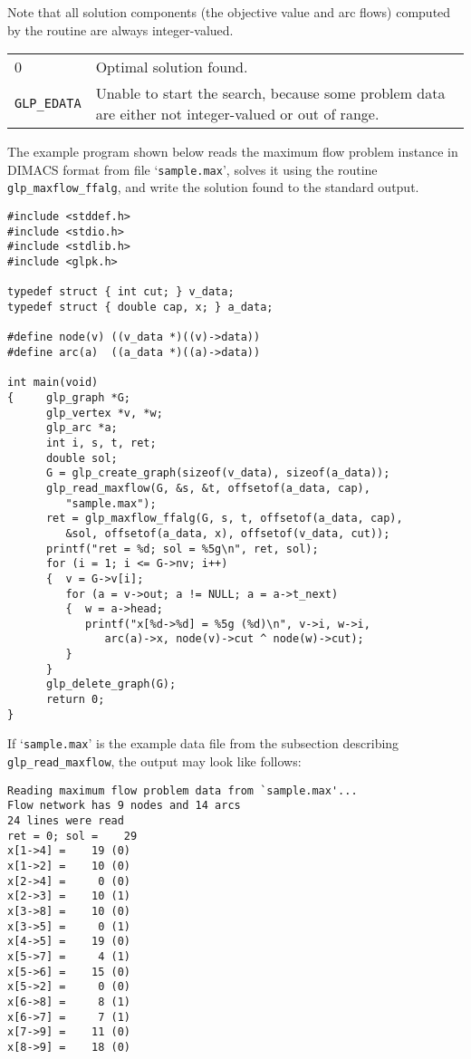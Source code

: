 \documentclass[11pt]{report}
\makeatletter
\def\para#1{\noindent{\bf#1}}
\def\returns{\para{Returns}}
\newenvironment{retlist}
{  \def\arraystretch{1.5}
   \noindent
   \begin{tabular}{@{}p{1in}@{}p{5.5in}@{}}
}
{\end{tabular}}
\makeatother
\begin{document}
Note that all solution components (the objective value and arc flows)
computed by the routine are always integer-valued.

\returns

\begin{retlist}
0 & Optimal solution found.\\

\verb|GLP_EDATA| & Unable to start the search, because some problem
data are either not integer-valued or out of range.\\
\end{retlist}

\para{Example}

The example program shown below reads the maximum flow problem instance
in DIMACS format from file `\verb|sample.max|', solves it using the
routine \verb|glp_maxflow_ffalg|, and write the solution found to the
standard output.

\begin{footnotesize}
\begin{verbatim}
#include <stddef.h>
#include <stdio.h>
#include <stdlib.h>
#include <glpk.h>

typedef struct { int cut; } v_data;
typedef struct { double cap, x; } a_data;

#define node(v) ((v_data *)((v)->data))
#define arc(a)  ((a_data *)((a)->data))

int main(void)
{     glp_graph *G;
      glp_vertex *v, *w;
      glp_arc *a;
      int i, s, t, ret;
      double sol;
      G = glp_create_graph(sizeof(v_data), sizeof(a_data));
      glp_read_maxflow(G, &s, &t, offsetof(a_data, cap),
         "sample.max");
      ret = glp_maxflow_ffalg(G, s, t, offsetof(a_data, cap),
         &sol, offsetof(a_data, x), offsetof(v_data, cut));
      printf("ret = %d; sol = %5g\n", ret, sol);
      for (i = 1; i <= G->nv; i++)
      {  v = G->v[i];
         for (a = v->out; a != NULL; a = a->t_next)
         {  w = a->head;
            printf("x[%d->%d] = %5g (%d)\n", v->i, w->i,
               arc(a)->x, node(v)->cut ^ node(w)->cut);
         }
      }
      glp_delete_graph(G);
      return 0;
}
\end{verbatim}
\end{footnotesize}

If `\verb|sample.max|' is the example data file from the subsection
describing \verb|glp_read_maxflow|, the output may look like follows:

\begin{footnotesize}
\begin{verbatim}
Reading maximum flow problem data from `sample.max'...
Flow network has 9 nodes and 14 arcs
24 lines were read
ret = 0; sol =    29
x[1->4] =    19 (0)
x[1->2] =    10 (0)
x[2->4] =     0 (0)
x[2->3] =    10 (1)
x[3->8] =    10 (0)
x[3->5] =     0 (1)
x[4->5] =    19 (0)
x[5->7] =     4 (1)
x[5->6] =    15 (0)
x[5->2] =     0 (0)
x[6->8] =     8 (1)
x[6->7] =     7 (1)
x[7->9] =    11 (0)
x[8->9] =    18 (0)
\end{verbatim}
\end{footnotesize}
\end{document}
